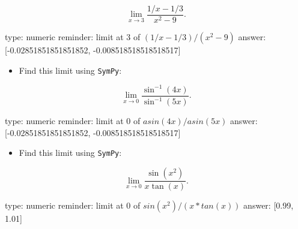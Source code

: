 \documentclass[12pt]{article}
\begin{document}
\[
\lim_{x \rightarrow 3} \frac{1/x - 1/3}{x^2 - 9}.
\]

\begin{answer}
    type: numeric
    reminder: limit at 3 of \( (1/x - 1/3) / (x^2 - 9) \)
    answer: [-0.02851851851851852, -0.008518518518518517]

\end{answer}

\begin{itemize}
\itemsep1pt\parskip0pt
\item
  Find this limit using \texttt{SymPy}:
\end{itemize}

\[
\lim_{x \rightarrow 0} \frac{\sin^{-1}(4x)}{\sin^{-1}(5x)}.
\]

\begin{answer}
    type: numeric
    reminder: limit at 0 of \( asin(4x)/asin(5x) \)
    answer: [-0.02851851851851852, -0.008518518518518517]

\end{answer}

\begin{itemize}
\itemsep1pt\parskip0pt
\item
  Find this limit using \texttt{SymPy}:
\end{itemize}

\[
\lim_{x \rightarrow 0} \frac{\sin(x^2)}{x\tan(x)}.
\]

\begin{answer}
    type: numeric
    reminder: limit at 0 of \( sin(x^2)/(x*tan(x)) \)
    answer: [0.99, 1.01]

\end{answer}
\end{document}

